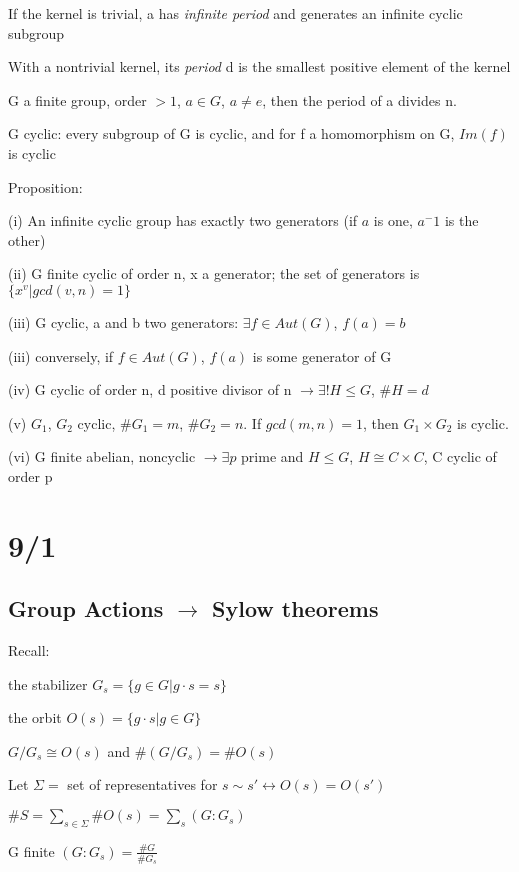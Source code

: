 \documentclass[12pt]{article}
\begin{document}
If the kernel is trivial, a has \textit{infinite period} and generates an infinite cyclic subgroup

With a nontrivial kernel, its \textit{period} d is the smallest positive element of the kernel

\noindent
G a finite group, order $> 1$, $a \in G$, $a \neq e$, then the period of a divides n.

\noindent
G cyclic: every subgroup of G is cyclic, and for f a homomorphism on G, $Im(f)$ is cyclic

\noindent
Proposition:

(i) An infinite cyclic group has exactly two generators (if $a$ is one, $a^-1$ is the other)

(ii) G finite cyclic of order n, x a generator; the set of generators is $\{x^v| gcd(v, n) = 1\}$

(iii) G cyclic, a and b two generators: $\exists f \in Aut(G)$, $f(a) = b$

(iii) conversely, if $f \in Aut(G)$, $f(a)$ is some generator of G

(iv) G cyclic of order n, d positive divisor of n $\to \exists ! H \leq G$, $\#H = d$

(v) $G_1$, $G_2$ cyclic, $\#G_1 = m$, $\#G_2 = n$.  If $gcd(m, n) = 1$, then $G_1 \times G_2$ is cyclic.

(vi) G finite abelian, noncyclic $\to \exists p$ prime and $H \leq G$, $H \cong C \times C$, C cyclic of order p

\section{9/1}

\subsection{Group Actions $\to$ Sylow theorems}

Recall:

the stabilizer $G_s = \{g \in G | g \cdot s = s\}$

the orbit $O(s) = \{g \cdot s | g \in G\}$

$G\slash G_s \cong O(s)$ and $\#(G\slash G_s) = \#O(s)$

\noindent
Let $\Sigma =$ set of representatives for $s \sim s' \leftrightarrow O(s) = O(s')$

$\#S = \sum_{s \in \Sigma}\#O(s) = \sum_s(G:G_s)$

G finite $(G:G_s) = \frac{\#G}{\#G_s}$
\end{document}
